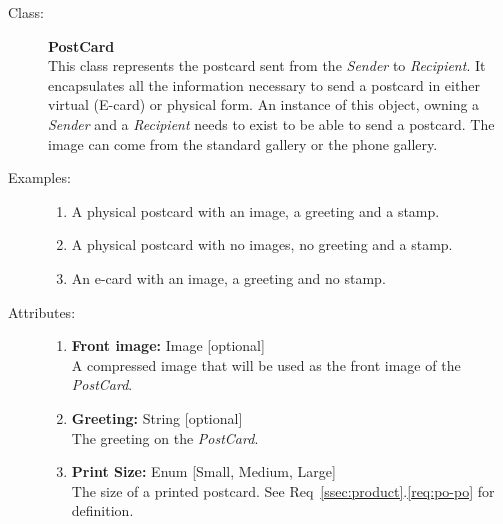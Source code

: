 \documentclass[10pt,a4paper]{article}
\begin{document}
\begin{description}
\item[Class:] \textbf{PostCard} \hfill \\
This class represents the postcard sent from the \textit{Sender} to \textit{Recipient}. It encapsulates all the information necessary to send a postcard in either virtual (E-card) or physical form. An instance of this object, owning a \textit{Sender} and a \textit{Recipient} needs to exist to be able to send a postcard. The image can come from the standard gallery or the phone gallery. 

\item[Examples:] \hfill
\begin{enumerate}
\item A physical postcard with an image, a greeting and a stamp.
\item A physical postcard with no images, no greeting and a stamp.
\item An e-card with an image, a greeting and no stamp.
\end{enumerate}

\item[Attributes:] \hfill
\begin{enumerate}
\item \textbf{Front image:} Image [optional] \hfill \\A compressed image that will be used as the front image of the \textit{PostCard}. 
\item \textbf{Greeting:} String [optional] \hfill \\The greeting on the \textit{PostCard}.
\item \textbf{Print Size:} Enum [Small, Medium, Large] \hfill \\The size of a printed postcard. See Req~\ref{ssec:product}.\ref{req:po-po} for definition.

\end{enumerate}
\end{description} 

\hrulefill
\end{document}

